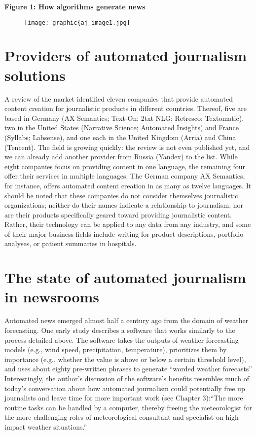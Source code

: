 \documentclass[notoc, symmetric, nobib, nols]{towcenter-guideto-book}
\begin{document}
\textbf{Figure 1: How algorithms generate news}
\begin{figure}
\begin{centering}
\texttt{[image: graphic\{aj\_image1.jpg]}
\end{centering}
\end{figure}

\section{Providers of automated journalism solutions}

A review of the market identified eleven companies that provide automated content creation for journalistic products in different countries.\autocite{doerr15} Thereof, five are based in Germany (AX Semantics; Text-On; 2txt NLG; Retresco; Textomatic), two in the United States (Narrative Science; Automated Insights) and France (Syllabs; Labsense), and one each in the United Kingdom (Arria) and China (Tencent). The field is growing quickly: the review is not even published yet, and we can already add another provider from Russia (Yandex) to the list. While eight companies focus on providing content in one language, the remaining four offer their services in multiple languages. The German company AX Semantics, for instance, offers automated content creation in as many as twelve languages. It should be noted that these companies do not consider themselves journalistic organizations; neither do their names indicate a relationship to journalism, nor are their products specifically geared toward providing journalistic content. Rather, their technology can be applied to any data from any industry, and some of their major business fields include writing for product descriptions, portfolio analyses, or patient summaries in hospitals. 

\section{The state of automated journalism in newsrooms}

Automated news emerged almost half a century ago from the domain of weather forecasting. One early study describes a software that works similarly to the process detailed above. The software takes the outputs of weather forecasting models (e.g., wind speed, precipitation, temperature), prioritizes them by importance (e.g., whether the value is above or below a certain threshold level), and uses about eighty pre-written phrases to generate ``worded weather forecasts'' Interestingly, the author's discussion of the software's benefits resembles much of today's conversation about how automated journalism could potentially free up journalists and leave time for more important work (see Chapter 3):``The more routine tasks can be handled by a computer, thereby freeing the meteorologist for the more challenging roles of meteorological consultant and specialist on high-impact weather situations.''\autocite{glahn70}
\end{document}
